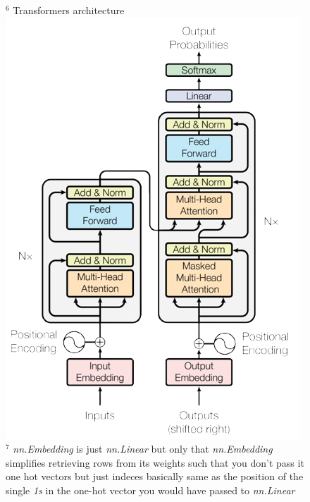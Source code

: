 \documentclass[12pt]{article}
\begin{document}
\begin{figure}[!htb]
\begin{minipage}[t]{.4\textwidth}
      \raggedright
      \scriptsize 
      $^6$ Transformers architecture\\
      \includegraphics[width=\textwidth]{images/transformers.png}\\
      \vspace{2em}
      $^7$ {\it nn.Embedding} is just {\it nn.Linear} but only that {\it nn.Embedding} simplifies retrieving rows from its weights 
      such that you don't pass it one hot vectors but just indeces basically same as the position of the single {\it 1s} in the 
      one-hot vector you would have passed to {\it nn.Linear}
    \end{minipage}
\end{figure}
\pagebreak
\end{document}

